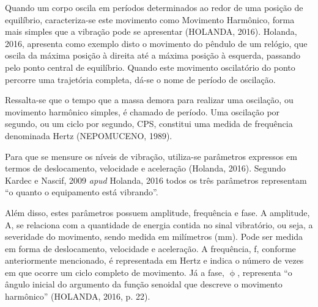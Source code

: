 \documentclass[
	12pt,				
	oneside,			
	a4paper,			
	english,			
	brazil,			
	]{abntex2ppgsi}
\begin{document}

Quando um corpo oscila em períodos determinados ao redor de uma posição de equilíbrio, caracteriza-se este movimento como Movimento Harmônico, forma mais simples que a vibração pode se apresentar (HOLANDA, 2016). Holanda, 2016, apresenta como exemplo disto o movimento do pêndulo de um relógio, que oscila da máxima posição à direita até a máxima posição à esquerda, passando pelo ponto central de equilíbrio. Quando este movimento oscilatório do ponto percorre uma trajetória completa, dá-se o nome de período de oscilação.  



Ressalta-se que o tempo que a massa demora para realizar uma oscilação, ou movimento harmônico simples, é chamado de período. Uma oscilação por segundo, ou um ciclo por segundo, CPS, constitui uma medida de frequência denominada Hertz (NEPOMUCENO, 1989). 



Para que se mensure os níveis de vibração, utiliza-se parâmetros expressos em termos de deslocamento, velocidade e aceleração (Holanda, 2016). Segundo Kardec e Nascif, 2009 \textit{apud} Holanda, 2016 todos os três parâmetros representam “o quanto o equipamento está vibrando”. 

Além disso, estes parâmetros possuem amplitude, frequência e fase. A amplitude, A, se relaciona com a quantidade de energia contida no sinal vibratório, ou seja, a severidade do movimento, sendo medida em milímetros (mm). Pode ser medida em forma de deslocamento, velocidade e aceleração. A frequência, f, conforme anteriormente mencionado, é representada em Hertz e indica o número de vezes em que ocorre um ciclo completo de movimento. Já a fase, $\upphi$, representa “o ângulo inicial do argumento da função senoidal que descreve o movimento harmônico” (HOLANDA, 2016, p. 22).
\end{document}
